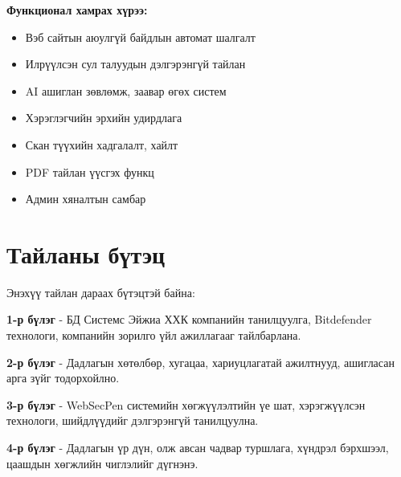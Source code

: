\documentclass[main.tex]{subfiles}
\begin{document}
\textbf{Функционал хамрах хүрээ:}

\begin{itemize}
    \item Вэб сайтын аюулгүй байдлын автомат шалгалт
    \item Илрүүлсэн сул талуудын дэлгэрэнгүй тайлан
    \item AI ашиглан зөвлөмж, заавар өгөх систем
    \item Хэрэглэгчийн эрхийн удирдлага
    \item Скан түүхийн хадгалалт, хайлт
    \item PDF тайлан үүсгэх функц
    \item Админ хяналтын самбар
\end{itemize}

\section*{Тайланы бүтэц}

Энэхүү тайлан дараах бүтэцтэй байна:

\textbf{1-р бүлэг} - БД Системс Эйжиа ХХК компанийн танилцуулга, Bitdefender технологи, компанийн зорилго үйл ажиллагааг тайлбарлана.

\textbf{2-р бүлэг} - Дадлагын хөтөлбөр, хугацаа, хариуцлагатай ажилтнууд, ашигласан арга зүйг тодорхойлно.

\textbf{3-р бүлэг} - WebSecPen системийн хөгжүүлэлтийн үе шат, хэрэгжүүлсэн технологи, шийдлүүдийг дэлгэрэнгүй танилцуулна.

\textbf{4-р бүлэг} - Дадлагын үр дүн, олж авсан чадвар туршлага, хүндрэл бэрхшээл, цаашдын хөгжлийн чиглэлийг дүгнэнэ.

\newpage
{}
\setcounter{page}{1}
\end{document}
